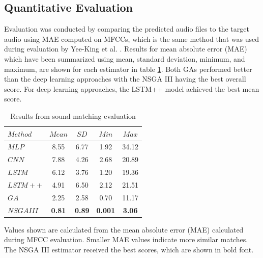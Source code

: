 \subsection{Quantitative Evaluation}
Evaluation was conducted by comparing the predicted audio files to the target audio using MAE computed on MFCCs, which is the same method that was used during evaluation by Yee-King et al. \cite{yee2018automatic}. Results for mean absolute error (MAE) which have been summarized using mean, standard deviation, minimum, and maximum, are shown for each estimator in table \ref{tbl:sound_match_eval}. Both GAs performed better than the deep learning approaches with the NSGA III having the best overall score. For deep learning approaches, the LSTM++ model achieved the best mean score.

\begin{table}[t]
\centering
\caption{Results from sound matching evaluation}
\label{tbl:sound_match_eval}
\begin{threeparttable}
\begin{tabular}{l|cccc}
\toprule
$Method$ & $Mean$ & $SD$ & $Min$ & $Max$ \\
\midrule
$MLP$ & 8.55 & 6.77 & 1.92 & 34.12 \\
$CNN$ & 7.88 & 4.26 & 2.68 & 20.89 \\
$LSTM$ & 6.12 & 3.76 & 1.20 & 19.36 \\
$LSTM++$ & 4.91 & 6.50 & 2.12 & 21.51 \\
$GA$ & 2.25 & 2.58 & 0.70 & 11.17 \\
$NSGA III$ & \textbf{0.81} & \textbf{0.89} & \textbf{0.001} & \textbf{3.06} \\
\bottomrule
\end{tabular}
\begin{tablenotes}
\footnotesize
\item Values shown are calculated from the mean absolute error (MAE) calculated during MFCC evaluation. Smaller MAE values indicate more similar matches. The NSGA III estimator received the best scores, which are shown in bold font.
\end{tablenotes}
\end{threeparttable}
\end{table}



